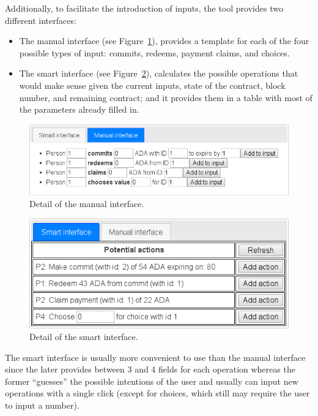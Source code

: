 \documentclass[
      acmsmall
    , screen
    , review=true
  ]{acmart}
\begin{document}
Additionally, to facilitate the introduction of inputs, the tool provides
two different interfaces:
\begin{itemize}
\item The manual interface (see Figure~\ref{fig:detail-of-manual-interface}),
provides a template for each of the four possible types of input:
commits, redeems, payment claims, and choices.
\item The smart interface (see Figure~\ref{fig:detail-of-smart-interface}),
calculates the possible operations that would make sense given the
current inputs, state of the contract, block number, and remaining
contract; and it provides them in a table with most of the parameters
already filled in.
\end{itemize}
\begin{figure}
\begin{centering}
\includegraphics[scale=0.5]{pix/detail3}
\par\end{centering}
\caption{\label{fig:detail-of-manual-interface}Detail of the manual interface.}
\end{figure}

\begin{figure}
\centering{}\includegraphics[scale=0.5]{pix/detail4}\caption{\label{fig:detail-of-smart-interface}Detail of the smart 
interface.}
\end{figure}

The smart interface is usually more convenient to use than the manual
interface since the later provides between 3 and 4 fields for each
operation whereas the former ``guesses'' the possible intentions
of the user and usually can input new operations with a single click
(except for choices, which still may require the user to input a number).
\end{document}
